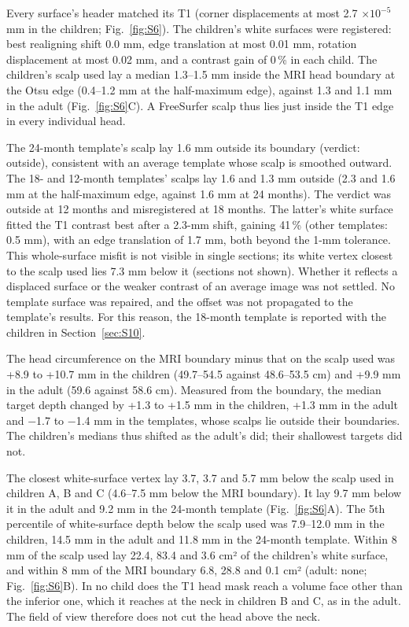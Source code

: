 \documentclass[preprint,12pt,authoryear,a4paper]{elsarticle}
\begin{document}
Every surface's header matched its T1 (corner displacements at most 2.7 $\times 10^{-5}$ mm in the children; Fig.~\ref{fig:S6}). The children's white surfaces were registered: best realigning shift 0.0 mm, edge translation at most 0.01 mm, rotation displacement at most 0.02 mm, and a contrast gain of 0\,\% in each child. The children's scalp used lay a median 1.3–1.5 mm inside the MRI head boundary at the Otsu edge (0.4–1.2 mm at the half-maximum edge), against 1.3 and 1.1 mm in the adult (Fig.~\ref{fig:S6}C). A FreeSurfer scalp thus lies just inside the T1 edge in every individual head.

The 24-month template's scalp lay 1.6 mm outside its boundary (verdict: outside), consistent with an average template whose scalp is smoothed outward. The 18- and 12-month templates' scalps lay 1.6 and 1.3 mm outside (2.3 and 1.6 mm at the half-maximum edge, against 1.6 mm at 24 months). The verdict was outside at 12 months and misregistered at 18 months. The latter's white surface fitted the T1 contrast best after a 2.3-mm shift, gaining 41\,\% (other templates: 0.5 mm), with an edge translation of 1.7 mm, both beyond the 1-mm tolerance. This whole-surface misfit is not visible in single sections; its white vertex closest to the scalp used lies 7.3 mm below it (sections not shown). Whether it reflects a displaced surface or the weaker contrast of an average image was not settled. No template surface was repaired, and the offset was not propagated to the template's results. For this reason, the 18-month template is reported with the children in Section~\ref{sec:S10}.

The head circumference on the MRI boundary minus that on the scalp used was +8.9 to +10.7 mm in the children (49.7–54.5 against 48.6–53.5 cm) and +9.9 mm in the adult (59.6 against 58.6 cm). Measured from the boundary, the median target depth changed by +1.3 to +1.5 mm in the children, +1.3 mm in the adult and −1.7 to −1.4 mm in the templates, whose scalps lie outside their boundaries. The children's medians thus shifted as the adult's did; their shallowest targets did not.

The closest white-surface vertex lay 3.7, 3.7 and 5.7 mm below the scalp used in children A, B and C (4.6–7.5 mm below the MRI boundary). It lay 9.7 mm below it in the adult and 9.2 mm in the 24-month template (Fig.~\ref{fig:S6}A). The 5th percentile of white-surface depth below the scalp used was 7.9–12.0 mm in the children, 14.5 mm in the adult and 11.8 mm in the 24-month template. Within 8 mm of the scalp used lay 22.4, 83.4 and 3.6 cm² of the children's white surface, and within 8 mm of the MRI boundary 6.8, 28.8 and 0.1 cm² (adult: none; Fig.~\ref{fig:S6}B). In no child does the T1 head mask reach a volume face other than the inferior one, which it reaches at the neck in children B and C, as in the adult. The field of view therefore does not cut the head above the neck.
\end{document}
